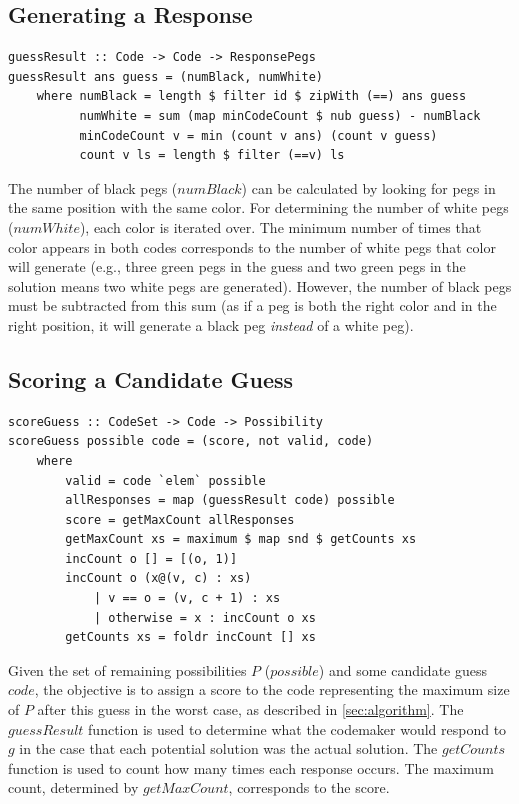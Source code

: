 \documentclass{article}
\begin{document}
\subsection{Generating a Response}
\begin{verbatim}
guessResult :: Code -> Code -> ResponsePegs
guessResult ans guess = (numBlack, numWhite)
    where numBlack = length $ filter id $ zipWith (==) ans guess
          numWhite = sum (map minCodeCount $ nub guess) - numBlack
          minCodeCount v = min (count v ans) (count v guess)
          count v ls = length $ filter (==v) ls
\end{verbatim}
The number of black pegs ($numBlack$) can be calculated by looking for pegs in the same position with the same color. For determining the number of white pegs ($numWhite$), each color is iterated over. The minimum number of times that color appears in both codes corresponds to the number of white pegs that color will generate (e.g., three green pegs in the guess and two green pegs in the solution means two white pegs are generated). However, the number of black pegs must be subtracted from this sum (as if a peg is both the right color and in the right position, it will generate a black peg \textit{instead} of a white peg).

\subsection{Scoring a Candidate Guess}
\begin{verbatim}
scoreGuess :: CodeSet -> Code -> Possibility
scoreGuess possible code = (score, not valid, code)
    where
        valid = code `elem` possible
        allResponses = map (guessResult code) possible
        score = getMaxCount allResponses
        getMaxCount xs = maximum $ map snd $ getCounts xs
        incCount o [] = [(o, 1)]
        incCount o (x@(v, c) : xs)
            | v == o = (v, c + 1) : xs
            | otherwise = x : incCount o xs
        getCounts xs = foldr incCount [] xs
\end{verbatim}
Given the set of remaining possibilities $P$ ($possible$) and some candidate guess $code$, the objective is to assign a score to the code representing the maximum size of $P$ after this guess in the worst case, as described in \autoref{sec:algorithm}. The $guessResult$ function is used to determine what the codemaker would respond to $g$ in the case that each potential solution was the actual solution. The $getCounts$ function is used to count how many times each response occurs. The maximum count, determined by $getMaxCount$, corresponds to the score.
\end{document}
